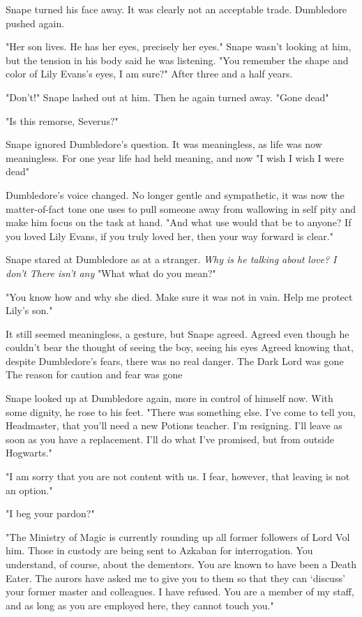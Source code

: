Snape turned his face away. It was clearly not an acceptable trade. Dumbledore pushed again.

"Her son lives. He has her eyes, precisely her eyes." Snape wasn't looking at him, but the tension in his body said he was listening. "You remember the shape and color of Lily Evans's eyes, I am sure?" After three and a half years.

"Don't!" Snape lashed out at him. Then he again turned away. "Gone{\el} dead{\el}"

"Is this remorse, Severus?"

Snape ignored Dumbledore's question. It was meaningless, as life was now meaningless. For one year life had held meaning, and now{\el} "I wish{\el} I wish I were dead{\el}"

Dumbledore's voice changed. No longer gentle and sympathetic, it was now the matter-of-fact tone one uses to pull someone away from wallowing in self pity and make him focus on the task at hand. "And what use would that be to anyone? If you loved Lily Evans, if you truly loved her, then your way forward is clear."

Snape stared at Dumbledore as at a stranger. \emph{Why is he talking about love? I don't{\el} There isn't any{\el}} "What{\el} what do you mean?"

"You know how and why she died. Make sure it was not in vain. Help me protect Lily's son."

It still seemed meaningless, a gesture, but Snape agreed. Agreed even though he couldn't bear the thought of seeing the boy, seeing his eyes{\el} Agreed knowing that, despite Dumbledore's fears, there was no real danger. The Dark Lord was gone{\el} The reason for caution and fear was gone{\el}

Snape looked up at Dumbledore again, more in control of himself now. With some dignity, he rose to his feet. "There was something else. I've come to tell you, Headmaster, that you'll need a new Potions teacher. I'm resigning. I'll leave as soon as you have a replacement. I'll do what I've promised, but from outside Hogwarts."

"I am sorry that you are not content with us. I fear, however, that leaving is not an option."

"I beg your pardon?"

"The Ministry of Magic is currently rounding up all former followers of Lord Vol{\el} him. Those in custody are being sent to Azkaban for interrogation. You understand, of course, about the dementors. You are known to have been a Death Eater. The aurors have asked me to give you to them so that they can `discuss' your former master and colleagues. I have refused. You are a member of my staff, and as long as you are employed here, they cannot touch you."

